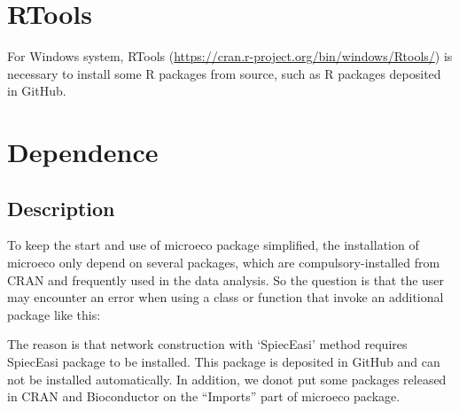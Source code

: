 \documentclass[
]{book}
\newenvironment{Shaded}{\begin{snugshade}}{\end{snugshade}}
\newcommand{\AttributeTok}[1]{\textcolor[rgb]{0.77,0.63,0.00}{#1}}
\newcommand{\FloatTok}[1]{\textcolor[rgb]{0.00,0.00,0.81}{#1}}
\newcommand{\FunctionTok}[1]{\textcolor[rgb]{0.00,0.00,0.00}{#1}}
\newcommand{\NormalTok}[1]{#1}
\newcommand{\OtherTok}[1]{\textcolor[rgb]{0.56,0.35,0.01}{#1}}
\newcommand{\SpecialCharTok}[1]{\textcolor[rgb]{0.00,0.00,0.00}{#1}}
\newcommand{\StringTok}[1]{\textcolor[rgb]{0.31,0.60,0.02}{#1}}
\begin{document}
\hypertarget{rtools}{%
\section{RTools}\label{rtools}}

For Windows system, RTools (\url{https://cran.r-project.org/bin/windows/Rtools/}) is necessary to install some R packages from source, such as R packages deposited in GitHub.

\hypertarget{dependence}{%
\section{Dependence}\label{dependence}}

\hypertarget{description}{%
\subsection{Description}\label{description}}

To keep the start and use of microeco package simplified,
the installation of microeco only depend on several packages, which are compulsory-installed from CRAN and frequently used in the data analysis.
So the question is that the user may encounter an error when using a class or function that invoke an additional package like this:

\begin{Shaded}
\end{Shaded}

\begin{Shaded}
\end{Shaded}

The reason is that network construction with `SpiecEasi' method requires SpiecEasi package to be installed.
This package is deposited in GitHub and can not be installed automatically.
In addition, we donot put some packages released in CRAN and Bioconductor on the ``Imports'' part of microeco package.
\end{document}
